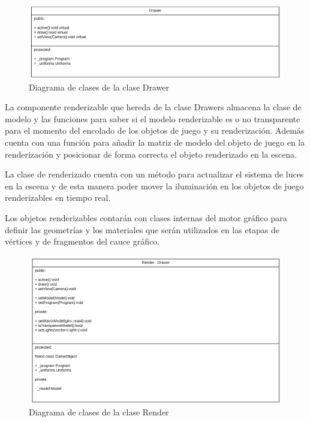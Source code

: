 \documentclass[a4paper, 17pt]{book}
\begin{document}
\begin{figure}[H]
    \centering
    \includegraphics[scale=0.25, keepaspectratio]{img/Drawer.png}
    \caption{Diagrama de clases de la clase Drawer}
    \label{figura:Drawer}
\end{figure}

La componente renderizable que hereda de la clase Drawers almacena la clase de modelo y las funciones para saber si el
modelo renderizable es o no transparente para el momento del encolado de los objetos de juego y su renderización. Además
cuenta con una función para añadir la matriz de modelo del objeto de juego en la renderización y posicionar de forma
correcta el objeto renderizado en la escena.

\vspace{1mm} %

La clase de renderizado cuenta con un método para actualizar el sistema de luces en la escena y de esta manera poder mover
la iluminación en los objetos de juego renderizables en tiempo real.

\vspace{1mm} %

Los objetos renderizables contarán con clases internas del motor gráfico para definir las geometrías y los materiales que
serán utilizados en las etapas de vértices y de fragmentos del cauce gráfico.

\begin{figure}[H]
    \centering
    \includegraphics[scale=0.25, keepaspectratio]{img/Render.png}
    \caption{Diagrama de clases de la clase Render}
    \label{figura:Render}
\end{figure}
\end{document}
